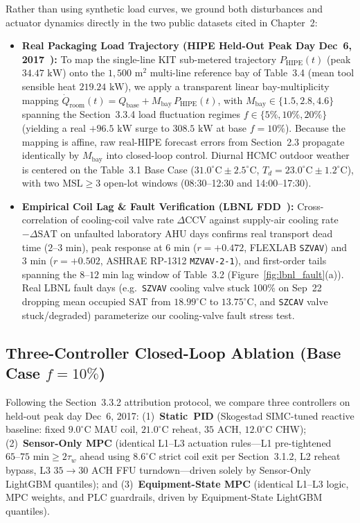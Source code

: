 Rather than using synthetic load curves, we ground both disturbances and actuator dynamics directly in the two public datasets cited in Chapter~2:
\begin{itemize}
    \item \textbf{Real Packaging Load Trajectory (HIPE Held-Out Peak Day Dec~6, 2017~\cite{hipe2018}):} To map the single-line KIT sub-metered trajectory $P_{\text{HIPE}}(t)$ (peak $34.47\text{ kW}$) onto the $1{,}500\text{ m}^2$ multi-line reference bay of Table~3.4 (mean tool sensible heat $219.24\text{ kW}$), we apply a transparent linear bay-multiplicity mapping $\dot{Q}_{\text{room}}(t) = Q_{\text{base}} + M_{\text{bay}}\,P_{\text{HIPE}}(t)$, with $M_{\text{bay}} \in \{1.5, 2.8, 4.6\}$ spanning the Section~3.3.4 load fluctuation regimes $f \in \{5\%, 10\%, 20\%\}$ (yielding a real $+96.5\text{ kW}$ surge to $308.5\text{ kW}$ at base $f = 10\%$). Because the mapping is affine, raw real-HIPE forecast errors from Section~2.3 propagate identically by $M_{\text{bay}}$ into closed-loop control. Diurnal HCMC outdoor weather is centered on the Table~3.1 Base Case ($31.0^\circ\text{C} \pm 2.5^\circ\text{C}$, $T_d = 23.0^\circ\text{C} \pm 1.2^\circ\text{C}$), with two $\text{MSL} \ge 3$ open-lot windows (08:30--12:30 and 14:00--17:30).
    \item \textbf{Empirical Coil Lag \& Fault Verification (LBNL FDD~\cite{lbnl2022}):} Cross-correlation of cooling-coil valve rate $\Delta\text{CCV}$ against supply-air cooling rate $-\Delta\text{SAT}$ on unfaulted laboratory AHU days confirms real transport dead time ($2\text{--}3\text{ min}$), peak response at $6\text{ min}$ ($r = +0.472$, FLEXLAB \texttt{SZVAV}) and $3\text{ min}$ ($r = +0.502$, ASHRAE RP-1312 \texttt{MZVAV-2-1}), and first-order tails spanning the $8\text{--}12\text{ min}$ lag window of Table~3.2 (Figure~\ref{fig:lbnl_fault}(a)). Real LBNL fault days (e.g.\ \texttt{SZVAV} cooling valve stuck 100\% on Sep~22 dropping mean occupied SAT from $18.99^\circ\text{C}$ to $13.75^\circ\text{C}$, and \texttt{SZCAV} valve stuck/degraded) parameterize our cooling-valve fault stress test.
\end{itemize}

\subsection{Three-Controller Closed-Loop Ablation (Base Case $f = 10\%$)}

Following the Section~3.3.2 attribution protocol, we compare three controllers on held-out peak day Dec~6, 2017: (1)~\textbf{Static~PID} (Skogestad SIMC-tuned reactive baseline: fixed $9.0^\circ\text{C}$ MAU coil, $21.0^\circ\text{C}$ reheat, $35\text{ ACH}$, $12.0^\circ\text{C}$ CHW); (2)~\textbf{Sensor-Only MPC} (identical L1--L3 actuation rules---L1 pre-tightened $65\text{--}75\text{ min} \ge 2\tau_w$ ahead using $8.6^\circ\text{C}$ strict coil exit per Section~3.1.2, L2 reheat bypass, L3 $35 \to 30\text{ ACH}$ FFU turndown---driven solely by Sensor-Only LightGBM quantiles); and (3)~\textbf{Equipment-State MPC} (identical L1--L3 logic, MPC weights, and PLC guardrails, driven by Equipment-State LightGBM quantiles).

